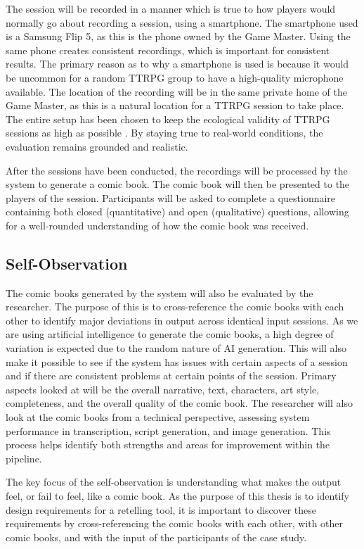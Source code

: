 The session will be recorded in a manner which is true to how players would normally go about recording a session, using a smartphone. The smartphone used is a Samsung Flip 5, as this is the phone owned by the Game Master. Using the same phone creates consistent recordings, which is important for consistent results. The primary reason as to why a smartphone is used is because it would be uncommon for a random TTRPG group to have a high-quality microphone available. The location of the recording will be in the same private home of the Game Master, as this is a natural location for a TTRPG session to take place. The entire setup has been chosen to keep the ecological validity of TTRPG sessions as high as possible \cite{kurniawan2004interaction}. By staying true to real-world conditions, the evaluation remains grounded and realistic.

After the sessions have been conducted, the recordings will be processed by the system to generate a comic book. The comic book will then be presented to the players of the session. Participants will be asked to complete a questionnaire containing both closed (quantitative) and open (qualitative) questions, allowing for a well-rounded understanding of how the comic book was received.

\subsection*{Self-Observation}
The comic books generated by the system will also be evaluated by the researcher. The purpose of this is to cross-reference the comic books with each other to identify major deviations in output across identical input sessions. As we are using artificial intelligence to generate the comic books, a high degree of variation is expected due to the random nature of AI generation. This will also make it possible to see if the system has issues with certain aspects of a session and if there are consistent problems at certain points of the session. Primary aspects looked at will be the overall narrative, text, characters, art style, completeness, and the overall quality of the comic book. The researcher will also look at the comic books from a technical perspective, assessing system performance in transcription, script generation, and image generation. This process helps identify both strengths and areas for improvement within the pipeline.

The key focus of the self-observation is understanding what makes the output feel, or fail to feel, like a comic book. As the purpose of this thesis is to identify design requirements for a retelling tool, it is important to discover these requirements by cross-referencing the comic books with each other, with other comic books, and with the input of the participants of the case study.

